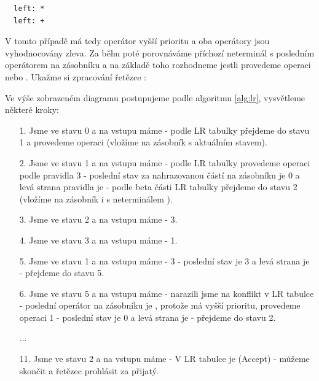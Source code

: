 \begin{exmp}
\begin{lstlisting}
  left: *
  left: +
\end{lstlisting}

V tomto případě má tedy operátor  \symb{*} vyšší prioritu a oba operátory jsou vyhodnocovány zleva.
Za běhu poté porovnáváme příchozí neterminál s posledním operátorem na zásobníku
a na základě toho rozhodneme jestli provedeme operaci  nebo .
Ukažme si zpracování řetězce :

\begin{figure}[H]
  \centering
\end{figure}

Ve výše zobrazeném diagramu postupujeme podle algoritmu \ref{alg:lr},
vysvětleme některé kroky:
  \begin{itemize}
    \item[1.] Jsme ve stavu 0 a na vstupu máme  - podle LR tabulky přejdeme do
    stavu 1 a provedeme operaci  (vložíme  na zásobník s aktuálním stavem).
    \item[2.] Jsme ve stavu 1 a na vstupu máme \symb{*} - podle LR tabulky provedeme
    operaci  podle pravidla 3 - poslední stav za nahrazovanou částí na
    zásobníku je 0 a levá strana pravidla je  - podle beta části LR tabulky
    přejdeme do stavu 2 (vložíme na zásobník i s neterminálem ).
    \item[3.] Jsme ve stavu 2 a na vstupu máme \symb{*} -  3.
    \item[4.] Jsme ve stavu 3 a na vstupu máme  -  1.
    \item[5.] Jsme ve stavu 1 a na vstupu máme \symb{+} -  3
     - poslední stav je 3 a levá strana je  - přejdeme do stavu 5.
    \item[6.] Jsme ve stavu 5 a na vstupu máme \symb{+} - narazili jsme na  konflikt
    v LR tabulce - poslední operátor na zásobníku je \symb{*}, protože má vyšší prioritu,
    provedeme operaci  1 - poslední stav je 0 a levá strana je  - přejdeme do stavu 2.
    \item[] ...
    \item[11.] Jsme ve stavu 2 a na vstupu máme \symb{\$} - V LR tabulce je 
    (Accept) - můžeme skončit a řetězec prohlásit za přijatý.
  \end{itemize}
\end{exmp}

